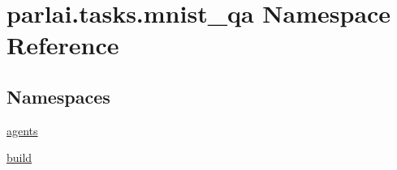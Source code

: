 \hypertarget{namespaceparlai_1_1tasks_1_1mnist__qa}{}\section{parlai.\+tasks.\+mnist\+\_\+qa Namespace Reference}
\label{namespaceparlai_1_1tasks_1_1mnist__qa}
\subsection*{Namespaces}
\begin{DoxyCompactItemize}
\item 
 \hyperlink{namespaceparlai_1_1tasks_1_1mnist__qa_1_1agents}{agents}
\item 
 \hyperlink{namespaceparlai_1_1tasks_1_1mnist__qa_1_1build}{build}
\end{DoxyCompactItemize}
